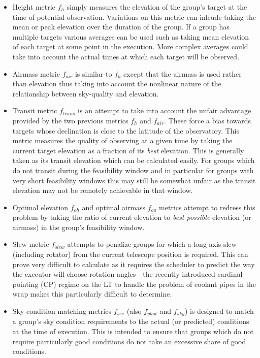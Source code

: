 \begin{itemize}
 
\item Height metric $f_h$ simply measures the elevation of the group's target at the time of potential observation. Variations on this metric can inlcude taking the mean or peak elevation over the duration of the group. If a group has multiple targets various averages can be used such as taking mean elevation of each target at some point in the execution. More complex averages could take into account the actual times at which each target will be observed. 
 
\item Airmass metric $f_{air}$ is similar to $f_h$ except that the airmass is used rather than elevation thus taking into account the nonlinear nature of the relationship between sky-quality and elevation.

\item Transit metric $f_{trans}$ is an attempt to take into account the unfair advantage provided by the two previous metrics $f_h$ and $f_{air}$. These force a bias towards targets whose declination is close to the latitude of the observatory. This metric measures the quality of observing at a given time by taking the current target elevation as a fraction of its \emph{best} elevation. This is generally taken as its transit elevation which can be calculated easily. For groups which do not transit during the feasibility window and in particular for groups with very short feasibility windows this may still be somewhat unfair as the transit elevation may not be remotely achievable in that window.

\item Optimal elevation $f_{oh}$ and optimal airmass $f_{oa}$ metrics attempt to redress this problem by taking the ratio of current elevation to \emph{best possible} elevation (or airmass) in the group's feasibility window. 

\item Slew metric $f_{slew}$ attempts to penalize groups for which a long axis slew (including rotator) from the current telescope position is required. This can prove very difficult to calculate as it requires the scheduler to predict the way the executor will choose rotation angles - the recently introduced cardinal pointing (CP) regime on the LT to handle the problem of coolant pipes in the wrap makes this particularly difficult to determine.

\item Sky condition matching metrics $f_{see}$ (also $f_{phot}$ and $f_{sky}$) is designed to match a group's sky condition requirements to the actual (or predicted) conditions at the time of execution. This is intended to ensure that groups which do not require particularly good conditions do not take an excessive share of good conditions.
 

\end{itemize}
